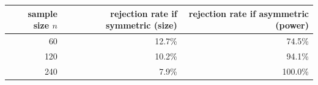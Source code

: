 \begin{tabular}{rrr}
\toprule
sample size $n$ & rejection rate if symmetric (size) & rejection rate if asymmetric (power) \\
\midrule
60 & 12.7\% & 74.5\% \\
120 & 10.2\% & 94.1\% \\
240 & 7.9\% & 100.0\% \\
\bottomrule
\end{tabular}
